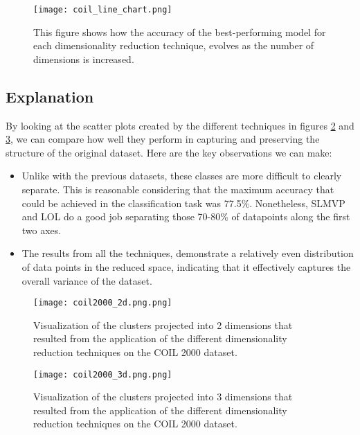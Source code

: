\begin{figure}[!h]
    \centering
    \texttt{[image: coil\_line\_chart.png]}
    \caption{This figure shows how the accuracy of the best-performing model for each dimensionality reduction technique, evolves as the number of dimensions is increased.}
    \label{fig:coil_line_chart}
\end{figure}

\subsection{Explanation}

By looking at the scatter plots created by the different techniques in figures \ref{fig:coil-2d} and \ref{fig:coil-3d}, we can compare how well they perform in capturing and preserving the structure of the original dataset. Here are the key observations we can make:

\begin{itemize}
    \item Unlike with the previous datasets, these classes are more difficult to clearly separate. This is reasonable considering that the maximum accuracy that could be achieved in the classification task was 77.5\%. Nonetheless, SLMVP and LOL do a good job separating those 70-80\% of datapoints along the first two axes.
    \item The results from all the techniques, demonstrate a relatively even distribution of data points in the reduced space, indicating that it effectively captures the overall variance of the dataset.
\end{itemize}

\begin{figure}[!ht]
    \centering
    \texttt{[image: coil2000\_2d.png.png]}
    \caption{Visualization of the clusters projected into 2 dimensions that resulted from the application of the different dimensionality reduction techniques on the COIL 2000 dataset.}
    \label{fig:coil-2d}
\end{figure}

\begin{figure}[!ht]
    \centering
    \texttt{[image: coil2000\_3d.png.png]}
    \caption{Visualization of the clusters projected into 3 dimensions that resulted from the application of the different dimensionality reduction techniques on the COIL 2000 dataset.}
    \label{fig:coil-3d}
\end{figure}

